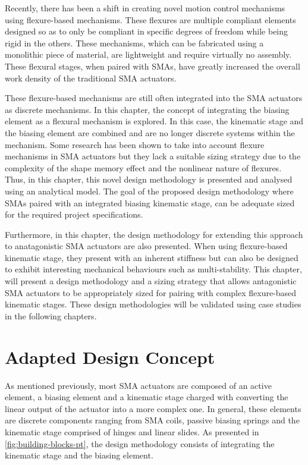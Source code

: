 
Recently, there has been a shift in creating novel motion control mechanisms using flexure-based mechanisms. These flexures are multiple compliant elements designed so as to only be compliant in specific degrees of freedom while being rigid in the others. These mechanisms, which can be fabricated using a monolithic piece of material, are lightweight and require virtually no assembly. These flexural stages, when paired with SMAs, have greatly increased the overall work density of the traditional SMA actuators\todocite.


These flexure-based mechanisms are still often integrated into the SMA actuators as discrete mechanisms. In this chapter, the concept of integrating the biasing element as a flexural mechanism is explored. In this case, the kinematic stage and the biasing element are combined and are no longer discrete systems within the mechanism. Some research has been shown to take into account flexure mechanisms in SMA actuators but they lack a suitable sizing strategy due to the complexity of the shape memory effect and the nonlinear nature of flexures\todocite. Thus, in this chapter, this novel design methodology is presented and analysed using an analytical model. The goal of the proposed design methodology where SMAs paired with an integrated biasing kinematic stage, can be adequate sized for the required project specifications.

Furthermore, in this chapter, the design methodology for extending this approach to anatagonistic SMA actuators are also presented. When using flexure-based kinematic stage, they present with an inherent stiffness but can also be designed to exhibit interesting mechanical behaviours such as multi-stability. This chapter, will present a design methodology and a sizing strategy that allows antagonistic SMA actuators to be appropriately sized for pairing with complex flexure-based kinematic stages. These design methodologies will be validated using case studies in the following chapters.

\section{Adapted Design Concept}
As mentioned previously, most SMA actuators are composed of an active element, a biasing element and a kinematic stage charged with converting the linear output of the actuator into a more complex one. In general, these elements are discrete components ranging from SMA coils, passive biasing springs and the kinematic stage comprised of hinges and linear slides. As presented in \cref{fig:building-blocks-pt}, the design methodology consists of integrating the kinematic stage and the biasing element.

